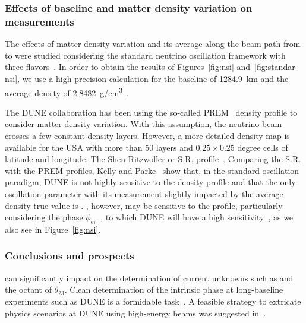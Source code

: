 \subsubsection{Effects of baseline and matter density variation on   measurements}\label{ssec:matter}
The effects of matter density variation and its average along the beam path from \fnal to \surf  were studied considering the standard neutrino oscillation framework with three flavors~\cite{Roe:2017zdw,Kelly:2018kmb}. In order to obtain the results of Figures~\ref{fig:nsi} and~\ref{fig:standar-nsi}, we use a high-precision calculation for the baseline of \SI{1284.9}{km} and the average density of \SI{2.8482}{g/cm^3}~\cite{Roe:2017zdw}.

The DUNE collaboration has been using the so-called PREM~\cite{Dziewonski:1981xy,PREM2} density profile to consider matter density variation. With this assumption, the neutrino beam crosses a few constant density layers.
However, a more detailed density map is available for the USA with more than 50 layers and $0.25 \times 0.25$ degree cells of latitude and longitude: The Shen-Ritzwoller or S.R. profile~\cite{SR:2016,Roe:2017zdw}. Comparing the S.R. with the PREM profiles, Kelly and Parke~\cite{Kelly:2018kmb} show that, in the standard oscillation paradigm, DUNE is not highly sensitive to the density profile and that the only oscillation parameter with its measurement slightly impacted by the average density true value is \deltacp{}.
, however, may be sensitive to the profile, particularly considering the phase $\phi_{e\tau}$~\cite{Chatterjee:2018dyd}, to which DUNE will have a high sensitivity~\cite{Ohlsson:2012kf,Miranda:2015dra,deGouvea:2015ndi,Coloma:2015kiu,Farzan:2017xzy}, as we also see in Figure~\ref{fig:nsi}.

\subsubsection{Conclusions and prospects}
 can significantly impact on the determination of current unknowns such as  and the octant of $\theta_{23}$. Clean determination of the intrinsic  phase at long-baseline experiments such as DUNE is a formidable task~\cite{Rout:2017udo}. A feasible strategy to extricate physics scenarios at DUNE using high-energy beams was suggested in~\cite{Masud:2017bcf}.

